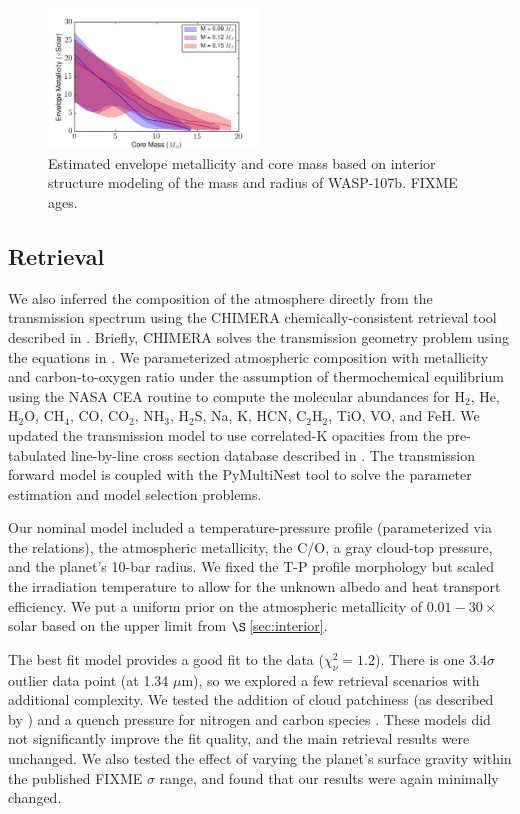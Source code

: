 \documentclass[twocolumn]{aastex61}
\begin{document}
\begin{figure}
\includegraphics[width = 0.5\textwidth]{Figures/metalByMass.png}
\caption{Estimated envelope metallicity and core mass based on interior structure modeling of the mass and radius of WASP-107b. FIXME ages.}
\label{fig:metal_prior}
\end{figure}

\subsection{Retrieval}
\label{sec:retrieval}
We also inferred the composition of the atmosphere directly from the transmission spectrum using the CHIMERA chemically-consistent retrieval tool described in \cite{kreidberg15b}.   Briefly, CHIMERA solves the transmission geometry problem using the equations in \cite{brown01, tinetti12}.  We parameterized atmospheric composition with metallicity and carbon-to-oxygen ratio under the assumption of thermochemical equilibrium using the NASA CEA routine \citep{gordon96} to compute the molecular abundances for H$_2$, He, H$_2$O, CH$_4$, CO, CO$_2$, NH$_3$, H$_2$S, Na, K, HCN, C$_2$H$_2$, TiO, VO, and FeH.    We updated the transmission model to use correlated-K opacities \citep{lacis91, molliere15, amundsen16} from the pre-tabulated line-by-line cross section database described in \cite{freedman14}. The transmission forward model is coupled with the PyMultiNest tool \citep{buchner16} to solve the parameter estimation and model selection problems.  

Our nominal model included a temperature-pressure profile (parameterized via the \citealt{guillot10} relations), the atmospheric metallicity, the C/O, a gray cloud-top pressure, and the planet's 10-bar radius.  We fixed the T-P profile morphology but scaled the irradiation temperature to allow for the unknown albedo and heat transport efficiency.  We put a uniform prior on the atmospheric metallicity of $0.01 - 30\times$ solar based on the upper limit from $\S$\,\ref{sec:interior}.  

The best fit model provides a good fit to the data ($\chi^2_\nu = 1.2$).  There is one $3.4\sigma$ outlier data point (at 1.34 $\mu$m), so we explored a few retrieval scenarios with additional complexity.  We tested the addition of cloud patchiness (as described by \citealt{line16}) and a quench pressure for nitrogen and carbon species \citep[to account for transport-induced disequilibrium chemistry, e.g.][]{morley17}.  These models did not significantly improve the fit quality, and the main retrieval results were unchanged. We also tested the effect of varying the planet's surface gravity within the published FIXME $\sigma$ range, and found that our results were again minimally changed.
\end{document}
